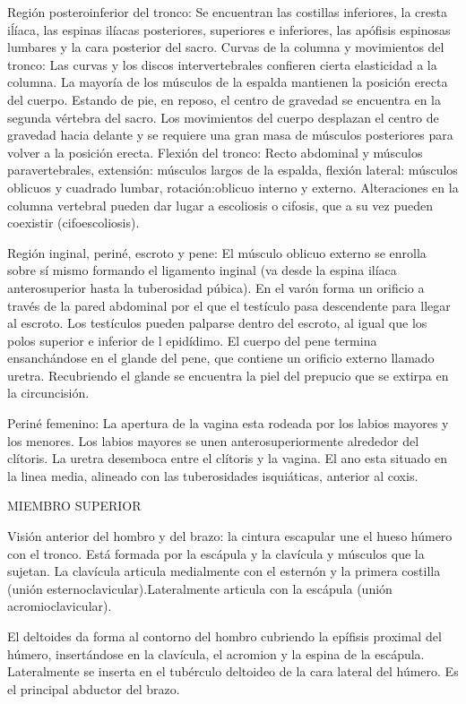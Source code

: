 \documentclass[a4paper,12pt]{article} %
\begin{document}
Región posteroinferior del tronco: Se encuentran las costillas inferiores, la cresta iĺíaca, las espinas ilíacas posteriores, superiores e inferiores, las apófisis espinosas lumbares y la cara posterior del sacro.
Curvas de la columna y movimientos del tronco: Las curvas y los discos intervertebrales confieren cierta elasticidad a la columna. La mayoría de los músculos de la espalda mantienen la posición erecta del cuerpo. Estando de pie, en reposo, el centro de gravedad se encuentra en la segunda vértebra del sacro. Los movimientos del cuerpo desplazan el centro de gravedad hacia delante y se requiere una gran masa de músculos posteriores para volver a la posición erecta. Flexión del tronco: Recto abdominal y músculos paravertebrales, extensión: músculos largos de la espalda, flexión lateral: músculos oblicuos y cuadrado lumbar, rotación:oblicuo interno y externo. Alteraciones en la columna vertebral pueden dar lugar a escoliosis o cifosis, que a su vez pueden coexistir (cifoescoliosis).

Región inginal, periné, escroto y pene: El músculo oblicuo externo se enrolla sobre sí mismo formando el ligamento inginal (va desde la espina ilíaca anterosuperior hasta la tuberosidad púbica). En el varón forma un orificio a través de la pared abdominal por el que el testículo pasa descendente para llegar al escroto. Los testículos pueden palparse dentro del escroto, al igual que los polos superior e inferior de l epidídimo. El cuerpo del pene termina ensanchándose en el glande del pene, que contiene un orificio externo llamado uretra. Recubriendo el glande se encuentra la piel del prepucio que se extirpa en la circuncisión.

Periné femenino: La apertura de la vagina esta rodeada por los labios mayores y los menores. Los labios mayores se unen anterosuperiormente alrededor del clítoris. La uretra desemboca entre el clítoris y la vagina. El ano esta situado en la linea media, alineado con las tuberosidades isquiáticas, anterior al coxis.


MIEMBRO SUPERIOR

Visión anterior del hombro y del brazo: la cintura escapular une el hueso húmero con el tronco. Está formada por la escápula y la clavícula y músculos que la sujetan. La clavícula articula medialmente con el esternón y la primera costilla (unión esternoclavicular).Lateralmente articula con la escápula (unión acromioclavicular).

El deltoides da forma al contorno del hombro cubriendo la epífisis proximal del húmero, insertándose en la clavícula, el acromion y la espina de la escápula. Lateralmente se inserta en el tubérculo deltoideo de la cara lateral del húmero. Es el principal abductor del brazo.
\end{document}
